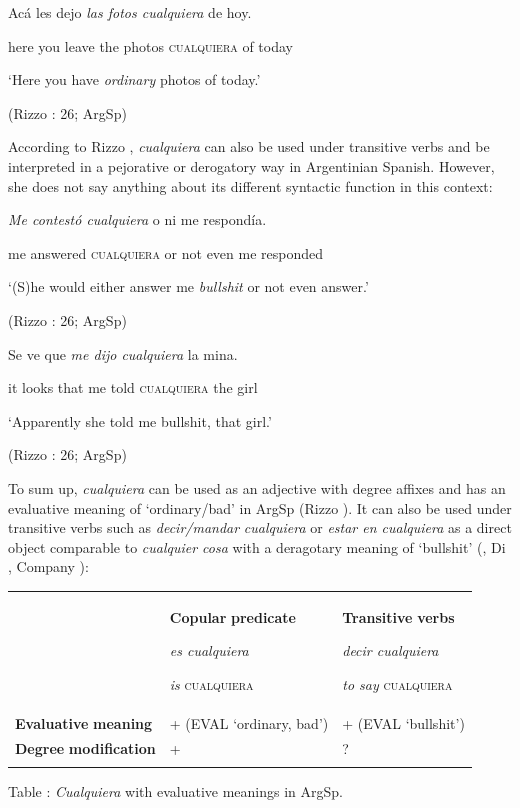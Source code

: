 \documentclass[output=paper]{langscibook}
\begin{document}
  Acá  les  dejo  \textit{las  fotos  cualquiera} de  hoy.

  here  you  leave  the  photos  \textsc{cualquiera}  of  today

  ‘Here you have \textit{ordinary} photos of today.’

  (Rizzo \citealt{Salierno2013}: 26; ArgSp)

According to Rizzo \citet{Salierno2013}, \textit{cualquiera} can also be used under transitive verbs and be interpreted in a pejorative or derogatory way in Argentinian Spanish. However, she does not say anything about its different syntactic function in this context:

  \textit{Me  contestó  cualquiera} o  ni  me  respondía.

  me  answered  \textsc{cualquiera} or  not even  me  responded

  ‘(S)he would either answer me \textit{bullshit} or not even answer.’

  (Rizzo \citealt{Salierno2013}: 26; ArgSp)

  Se  ve  que  \textit{me  dijo  cualquiera} la  mina.

  it  looks  that  me  told  \textsc{cualquiera}  the  girl

  ‘Apparently she told me bullshit, that girl.’

  (Rizzo \citealt{Salierno2013}: 26; ArgSp)

To sum up, \textit{cualquiera} can be used as an adjective with degree affixes and has an evaluative meaning of ‘ordinary/bad’ in ArgSp (Rizzo \citealt{Salierno2013}). It can also be used under transitive verbs such as \textit{decir/mandar} \textit{cualquiera} or \textit{estar en cualquiera} as a direct object comparable to \textit{cualquier cosa} with a deragotary meaning of ‘bullshit’ (\citealt{Conde2011}, Di \citealt{Tullio2013}, Company \citealt{Company2009}):


\begin{tabularx}{\textwidth}{XXX}

\lsptoprule
\multicolumn{1}{c}{} & { \textbf{Copular} \textbf{predicate}}

{ \textit{es cualquiera}}

 \textit{is} \textsc{cualquiera} & { \textbf{Transitive} \textbf{verbs}}

{ \textit{decir cualquiera}}

 \textit{to say} \textsc{cualquiera}\\
\textbf{Evaluative} \textbf{meaning} & + (EVAL ‘ordinary, bad’) & + (EVAL ‘bullshit’)\\
\textbf{Degree} \textbf{modification} & + & ?\\
\lspbottomrule
\end{tabularx}
\begin{styletablecaption}
Table : \textit{Cualquiera} with evaluative meanings in ArgSp.
\end{styletablecaption}
\end{document}
